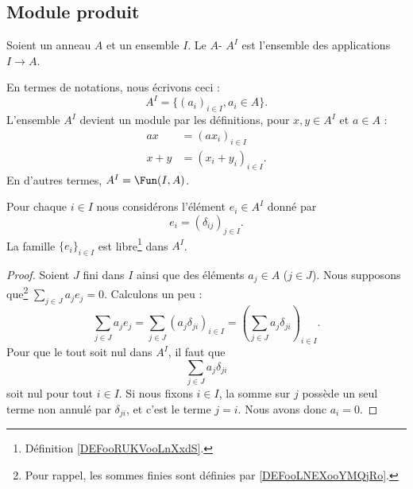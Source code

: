 \subsection{Module produit}

\begin{lemmaDef}        \label{DEFooLCJEooBvVmkV}
    Soient un anneau \( A\) et un ensemble \( I\). Le \( A\)- \( A^I\) est l'ensemble des applications \( I\to A\).

    En termes de notations, nous écrivons ceci :
    \begin{equation}
        A^I=\{ (a_i)_{i\in I},a_i\in A \}.
    \end{equation}
    L'ensemble \( A^I\) devient un module par les définitions, pour \( x,y\in A^I\) et \( a\in A\) :
    \begin{subequations}
        \begin{align}
            ax&=(ax_i)_{i\in I}\\
            x+y&=(x_i+y_i)_{i\in I}     \label{EQooODBMooQKLUgd}.
        \end{align}
    \end{subequations}
    En d'autres termes, \( A^I=\Fun(I,A)\).
\end{lemmaDef}

\begin{lemma}
    Pour chaque \( i\in I\) nous considérons l'élément \( e_i\in A^I\) donné par
    \begin{equation}
        e_i=(\delta_{ij})_{j\in I}.
    \end{equation}
    La famille \( \{ e_i \}_{i\in I}\) est libre\footnote{Définition \ref{DEFooRUKVooLnXxdS}.} dans \( A^I\).
\end{lemma}

\begin{proof}
    Soient \( J\) fini dans \( I\) ainsi que des éléments \( a_j\in A\) (\( j\in J\)). Nous supposons que\footnote{Pour rappel, les sommes finies sont définies par \ref{DEFooLNEXooYMQjRo}.} \( \sum_{j\in J}a_je_j=0\). Calculons un peu :
    \begin{equation}
        \sum_{j\in J}a_je_j=\sum_{j\in J}(a_j\delta_{ji})_{i\in I}=\left( \sum_{j\in J}a_j\delta_{ji} \right)_{i\in I}.
    \end{equation}
    Pour que le tout soit nul dans \( A^I\), il faut que
    \begin{equation}
        \sum_{j\in J}a_j\delta_{ji}
    \end{equation}
    soit nul pour tout \( i\in I\). Si nous fixons \( i\in I\), la somme sur \( j\) possède un seul terme non annulé par \( \delta_{ji}\), et c'est le terme \( j=i\). Nous avons donc \( a_i=0\).
\end{proof}

